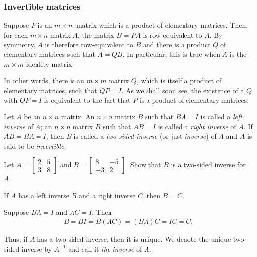 \documentclass[12pt,letterpaper,reqno]{article}
\numberwithin{equation}{section}
\newcommand{\ti}[1]{\textit{#1}}
\newcommand{\fixme}[1]{{\color{orange}{[#1]}}}
\begin{document}
\fixme{Exercise here?}

\subsubsection{Invertible matrices}
Suppose $P$ is an $m \times m$ matrix which is a product of elementary matrices. Then, for each $m \times n$ matrix $A$, the matrix $B=PA$ is row-equivalent to $A$. By symmetry, $A$ is therefore row-equivalent to $B$ and there is a product $Q$ of elementary matrices such that $A=QB$. In particular, this is true when $A$ is the $m \times m$ identity matrix. 

In other words, there is an $m \times m$ matrix $Q$, which is itself a product of elementary matrices, such that $QP=I$. As we shall soon see, the existence of a $Q$ with $QP=I$ is equivalent to the fact that $P$ is a product of elementary matrices.

\begin{defn}
	Let $A$ be an $n \times n$ matrix. An $n \times n$ matrix $B$ such that $BA=I$ is called a \ti{left inverse} of $A$; an $n \times n$ matrix $B$ such that $AB=I$ is called a \ti{right inverse} of $A$. If $AB=BA=I$, then $B$ is called a \ti{two-sided inverse} (or just \ti{inverse}) of $A$ and $A$ is said to be \ti{invertible}.
\end{defn}

\begin{exercise}
Let $A=\begin{bmatrix}
	2&5 \\ 3&8
\end{bmatrix}$ and $B=\begin{bmatrix}
	8&-5 \\ -3&2
\end{bmatrix}$. Show that $B$ is a two-sided inverse for $A$.	
\end{exercise}

\begin{thm}\label{thm:uniqueness_of_inverses}
	If $A$ has a left inverse $B$ and a right inverse $C$, then $B=C$. 
\end{thm}

\begin{pf}
Suppose $BA=I$ and $AC=I$. Then
\begin{align*}
	B=BI=B(AC)=(BA)C=IC=C. 
\end{align*}	
\end{pf}

Thus, if $A$ has a two-sided inverse, then it is unique. We denote the unique two-sided inverse by $A^{-1}$ and call it \ti{the inverse} of $A$.
\end{document}
